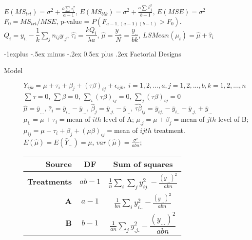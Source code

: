 \documentclass[10pt,landscape]{article}
\makeatletter
\renewcommand{\subsection}{\@startsection{subsection}{2}{0mm}%
                                {-1explus -.5ex minus -.2ex}%
                                {0.5ex plus .2ex}%
                                {\normalfont\normalsize\bfseries}}
\makeatother
\begin{document}
\begin{multicols}{3}
\begin{description}
\begin{center}
\begin{tabular}{r|cc}
            \end{tabular}
        \end{center}
        $E(MS_{trt}) = \sigma^2 + \frac{b\sum \tau_i^2}{a-1}$, $E(MS_{blk}) = \sigma^2 + \frac{a \sum \beta_j^2}{b-1}$, $E(MSE) = \sigma^2$\\
        $F_0 = MS_{trt}/MSE$, p-value = $P(F_{a-1, (a-1)(b-1)} > F_0)$.\\
        $Q_i = y_{i.} - \dfrac{1}{k} \sum_j n_{ij}y_{.j}$, $\hat{\tau_i} = \dfrac{kQ_i}{\lambda a}$, $\hat{\mu} = \dfrac{y_{..}}{N} = \dfrac{y_{..}}{bk}$, $LSMean(\mu_i) = \hat{\mu} + \hat{\tau}_i$
	\end{description}
	
	
\subsection{Factorial Designs}
	\begin{description}
	\item[Model] $Y_{ijk} = \mu + \tau_i + \beta_j + (\tau \beta)_{ij} + \epsilon_{ijk}, \ i = 1,2,...,a, j = 1,2,..., b, k = 1,2, ..., n$\\
	$\sum \tau = 0$, $\sum	\beta = 0$, $\sum_i (\tau \beta)_{ij}  = 0$, $\sum_j (\tau \beta)_{ij}  = 0$ \\ 
	$\hat{\mu} = \bar{y}_{...}$, $\hat{\tau}_i = \bar{y}_{i..} - \bar{y}_{...}$, $\hat{\beta}_j = \bar{y}_{.j.} - \bar{y}_{...}$, $\hat{\tau \beta}_{ij} = \bar{y}_{ij.} - \bar{y}_{i..} - \bar{y}_{.j.} + \bar{y}_{...}$\\
	$\mu_{i.} = \mu + \tau_i = $mean of $ith$ level of A; $\mu_{.j} = \mu + \beta_j = $mean of $jth$ level of B; $\mu_{ij} = \mu + \tau_i + \beta_j + (\mu \beta)_{ij}= $mean of $ijth$ treatment. \\ 
	$E(\hat{\mu}) = E(\bar{Y}_{...}) = \mu$, $var(\hat{\mu}) = \frac{\sigma^2}{abn}$; \\ 
		   \begin{center}
            \begin{tabular}{r|cc}
                \textbf{Source}  & \textbf{DF} & \textbf{Sum of squares}  \\ 
                \hline
                \textbf{Treatments} & $ab-1$ & $\frac{1}{n} \sum_i \sum_j y_{ij.}^2 - \frac{(y_{...})^2}{abn}$ \\
                \textbf{A} & $a-1$ & $\frac{1}{bn} \sum_i y_{i..}^2 - \frac{(y_{...})^2}{abn}$ \\
                \textbf{B} & $b-1$ & $\frac{1}{an} \sum_j y_{.j.}^2 - \dfrac{(y_{...})^2}{abn}$ \\

\end{tabular}
\end{center}
\end{description}
\end{multicols}
\end{document}
